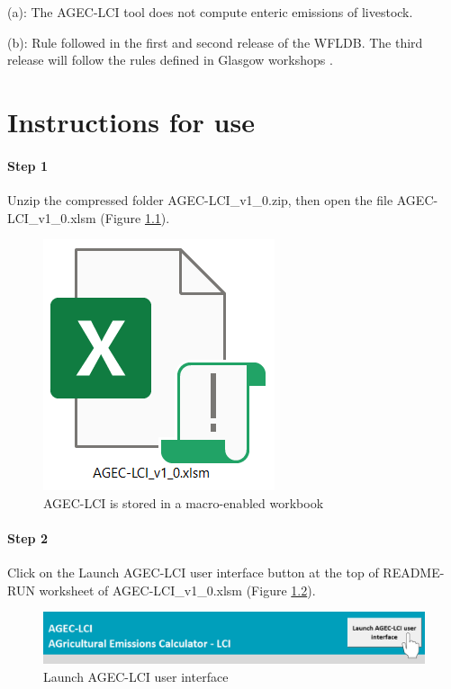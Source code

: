 \documentclass[openany]{book}
\begin{document}
(a): The AGEC-LCI tool does not compute enteric emissions of livestock.

(b): Rule followed in the first and second release of the WFLDB. The third release will follow the rules defined in Glasgow workshops \citep{nemecek2014}.

\hypertarget{instructions}{%
\chapter{Instructions for use}\label{instructions}}

\hypertarget{step-1}{%
\subsubsection*{Step 1}\label{step-1}}

Unzip the compressed folder AGEC-LCI\_v1\_0.zip, then open the file AGEC-LCI\_v1\_0.xlsm (Figure \ref{fig:agec-icon}).

\begin{figure}[ht]

{\centering \includegraphics[width=0.15\linewidth]{Figures/agec_lci_icon} 

}

\caption{AGEC-LCI is stored in a macro-enabled workbook}\label{fig:agec-icon}
\end{figure}

\hypertarget{step-2}{%
\subsubsection*{Step 2}\label{step-2}}

Click on the Launch AGEC-LCI user interface button at the top of README-RUN worksheet of AGEC-LCI\_v1\_0.xlsm (Figure \ref{fig:agec-lci-step1}).

\begin{figure}[ht]

{\centering \includegraphics[width=0.85\linewidth]{Figures/agec_lci_step1} 

}

\caption{Launch AGEC-LCI user interface}\label{fig:agec-lci-step1}
\end{figure}
\end{document}
